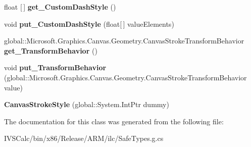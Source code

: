 \begin{DoxyCompactItemize}
float \mbox{[}$\,$\mbox{]} {\bfseries get\+\_\+\+Custom\+Dash\+Style} ()
\item 
\mbox{\label{class_microsoft_1_1_graphics_1_1_canvas_1_1_geometry_1_1_canvas_stroke_style_aeae34150ee1e2fcb07c434a9371be1da}} 
void {\bfseries put\+\_\+\+Custom\+Dash\+Style} (float\mbox{[}$\,$\mbox{]} value\+Elements)
\item 
\mbox{\label{class_microsoft_1_1_graphics_1_1_canvas_1_1_geometry_1_1_canvas_stroke_style_a26b6c215fb7192fa54e07e53785f0568}} 
global\+::\+Microsoft.\+Graphics.\+Canvas.\+Geometry.\+Canvas\+Stroke\+Transform\+Behavior {\bfseries get\+\_\+\+Transform\+Behavior} ()
\item 
\mbox{\label{class_microsoft_1_1_graphics_1_1_canvas_1_1_geometry_1_1_canvas_stroke_style_acc734915b10b7dd019e5423b04d56a48}} 
void {\bfseries put\+\_\+\+Transform\+Behavior} (global\+::\+Microsoft.\+Graphics.\+Canvas.\+Geometry.\+Canvas\+Stroke\+Transform\+Behavior value)
\item 
\mbox{\label{class_microsoft_1_1_graphics_1_1_canvas_1_1_geometry_1_1_canvas_stroke_style_a84473c4c8d10c25462fa224a25dae41b}} 
{\bfseries Canvas\+Stroke\+Style} (global\+::\+System.\+Int\+Ptr dummy)
\end{DoxyCompactItemize}


The documentation for this class was generated from the following file\+:\begin{DoxyCompactItemize}
\item 
I\+V\+S\+Calc/bin/x86/\+Release/\+A\+R\+M/ilc/Safe\+Types.\+g.\+cs\end{DoxyCompactItemize}
